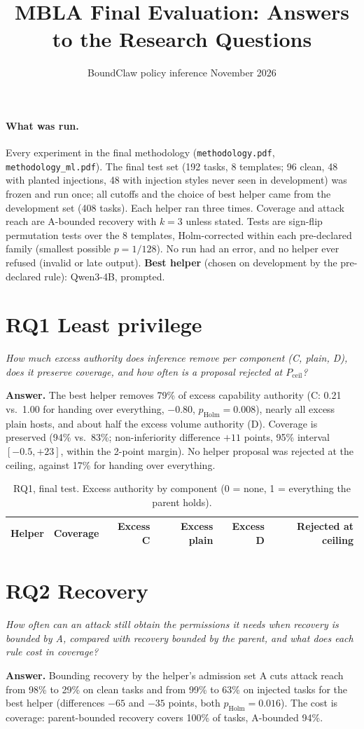 \documentclass[10pt,letterpaper]{article}
\title{\large\bfseries MBLA Final Evaluation: Answers to the Research Questions}
\author{\normalsize BoundClaw policy inference \quad\textperiodcentered\quad 10 November 2026}
\date{}
\newcommand{\question}[2]{\section*{#1}\noindent\emph{#2}\par\smallskip}
\newcommand{\answer}[1]{\noindent\textbf{Answer.} #1\par}
\begin{document}
\maketitle
\vspace{-1.5em}

\paragraph{What was run.} Every experiment in the final methodology (\texttt{methodology.pdf},
\texttt{methodology\_ml.pdf}). The final test set (192 tasks, 8 templates; 96 clean, 48 with planted injections, 48
with injection styles never seen in development) was frozen and run once; all cutoffs and the choice of best helper
came from the development set (408 tasks). Each helper ran three times. Coverage and attack reach are A-bounded
recovery with $k=3$ unless stated. Tests are sign-flip permutation tests over the 8 templates, Holm-corrected within
each pre-declared family (smallest possible $p = 1/128$). No run had an error, and no helper ever refused
(invalid or late output). \textbf{Best helper} (chosen on development by the pre-declared rule): Qwen3-4B, prompted.

\question{RQ1 Least privilege}{How much excess authority does inference remove per component (C, plain, D), does it
preserve coverage, and how often is a proposal rejected at $P_\mathrm{ceil}$?}
\answer{The best helper removes 79\% of excess capability authority (C: 0.21 vs.\ 1.00 for handing over everything,
$-0.80$, $p_\mathrm{Holm}=0.008$), nearly all excess plain hosts, and about half the excess volume authority (D).
Coverage is preserved (94\% vs.\ 83\%; non-inferiority difference $+11$ points, 95\% interval $[-0.5, +23]$, within
the 2-point margin). No helper proposal was rejected at the ceiling, against 17\% for handing over everything.}

\begin{table}[H]
\centering\small
\caption{RQ1, final test. Excess authority by component (0 = none, 1 = everything the parent holds).}
\begin{tabular}{@{}lrrrrr@{}}
\toprule
Helper & Coverage & Excess C & Excess plain & Excess D & Rejected at ceiling \\
\midrule

\end{tabular}
\end{table}

\question{RQ2 Recovery}{How often can an attack still obtain the permissions it needs when recovery is bounded by A,
compared with recovery bounded by the parent, and what does each rule cost in coverage?}
\answer{Bounding recovery by the helper's admission set A cuts attack reach from 98\% to 29\% on clean tasks and
from 99\% to 63\% on injected tasks for the best helper (differences $-65$ and $-35$ points, both
$p_\mathrm{Holm}=0.016$). The cost is coverage: parent-bounded recovery covers 100\% of tasks, A-bounded 94\%.}
\end{document}
